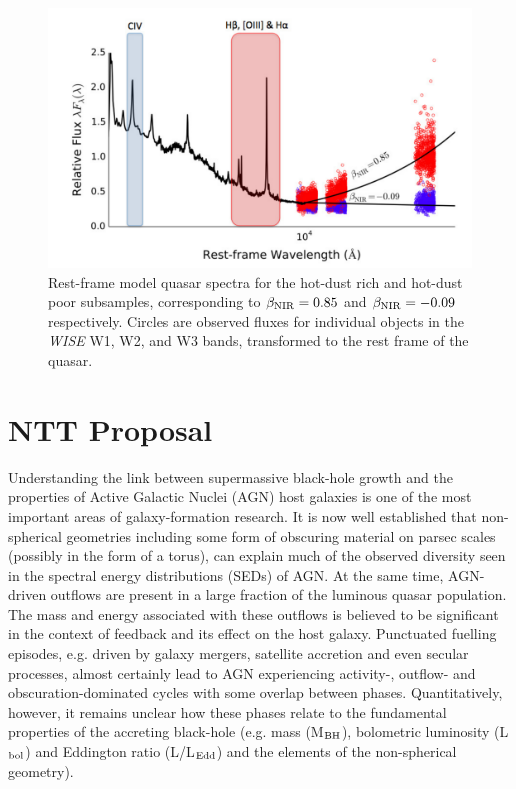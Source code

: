 \begin{figure}
\centering
  \includegraphics[width=\columnwidth]{figures/chapter06/wht_coatman_fig2.pdf}
\caption{Rest-frame model quasar spectra for the hot-dust rich and hot-dust poor subsamples, corresponding to $\beta_{\rm NIR} = 0.85$ and $\beta_{\rm NIR} = -0.09$ respectively.  Circles are observed fluxes for individual objects in the {\it WISE} W1, W2, and W3 bands, transformed to the rest frame of the quasar. }
  \label{fig:}
\end{figure}

\section{NTT Proposal}

Understanding the link between supermassive black-hole growth and the
properties of Active Galactic Nuclei (AGN) host galaxies is one of the
most important areas of galaxy-formation research. It is now well
established that non-spherical geometries including some form of
obscuring material on parsec scales (possibly in the form of a torus),
can explain much of the observed diversity seen in the spectral energy
distributions (SEDs) of AGN. At the same time, AGN-driven outflows are
present in a large fraction of the luminous quasar population. The
mass and energy associated with these outflows is believed to be
significant in the context of feedback and its effect on the host
galaxy. Punctuated fuelling episodes, e.g. driven by galaxy mergers,
satellite accretion and even secular processes, almost certainly lead
to AGN experiencing activity-, outflow- and obscuration-dominated
cycles with some overlap between phases. Quantitatively, however, it
remains unclear how these phases relate to the fundamental properties
of the accreting black-hole (e.g.  mass (M$_{\rm{BH}}$), bolometric
luminosity (L$_{\rm{bol}}$) and Eddington ratio (L/L$_{\rm{Edd}}$) and
the elements of the non-spherical geometry).

